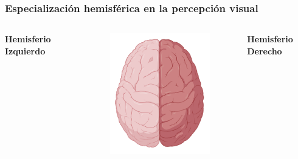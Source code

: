 \documentclass[
11pt, %
%
aspectratio=169, %
]{beamer}
\begin{document}
 	\begin{frame}
 		\frametitle{Especializaci\'on hemisf\'erica en la percepci\'on visual}
 		
 		\begin{columns}[c] %
 			\begin{column}{0.3\textwidth} %
 				\centering
 			\textbf{Hemisferio Izquierdo}\\ 					
 				
 			\end{column}
 			
 			\begin{column}{0.3\textwidth}
 				\centering
 				\begin{figure}     				
 					\includegraphics[scale=0.7]{Graphics/brain}
 				\end{figure}
 			\end{column}
 			
 			\begin{column}{0.3\textwidth} %
 				\centering
 				\textbf{Hemisferio Derecho}\\
 				
 			
 				
 				
 			\end{column}
 		\end{columns}
 		
 		
 	\end{frame}
 
 	
\end{document}
